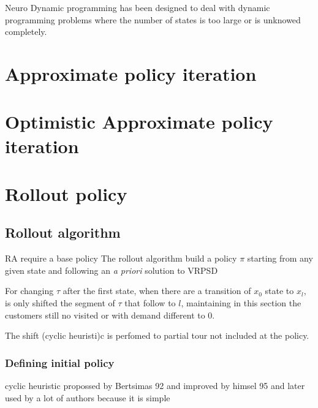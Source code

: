 Neuro Dynamic programming has been designed to deal with dynamic programming problems where the number of states is too large or is unknowed completely.

\cite{Bertsekas_1996}

\section{Approximate policy iteration}

\section{Optimistic Approximate policy iteration}

\section{Rollout policy}

\cite{Bertsekas_1997}


\subsection{Rollout algorithm}

RA require a base policy
The rollout algorithm build a policy $\pi$ starting from any given state and following an \textit{a priori} solution to VRPSD

For changing $\tau$ after the first state, when there are a transition of $x_0$ state to $x_l$, is only shifted the segment of $\tau$ that follow to $l$, maintaining in this section the customers still no visited or with demand different to $0$.

The shift (cyclic heuristi)c is perfomed to partial tour not included at the policy.


\subsubsection{Defining initial policy}\label{sec:initial_policy}


cyclic heuristic propossed by Bertsimas 92  and improved by himsel 95 and later used by a lot of authors because it is simple 

